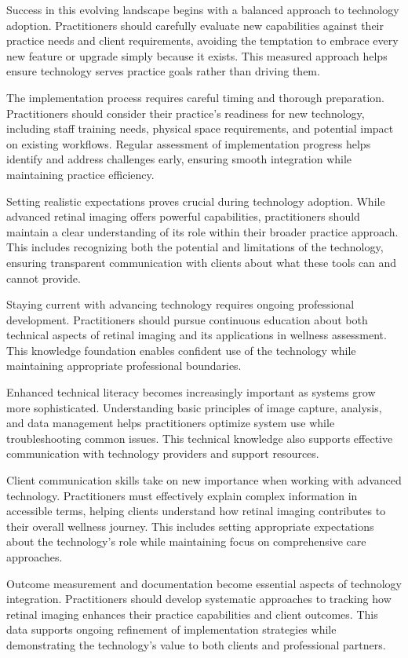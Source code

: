 \documentclass[
  Letterpaper,
]{scrbook}
\begin{document}
Success in this evolving landscape begins with a balanced approach to
technology adoption. Practitioners should carefully evaluate new
capabilities against their practice needs and client requirements,
avoiding the temptation to embrace every new feature or upgrade simply
because it exists. This measured approach helps ensure technology serves
practice goals rather than driving them.

The implementation process requires careful timing and thorough
preparation. Practitioners should consider their practice's readiness
for new technology, including staff training needs, physical space
requirements, and potential impact on existing workflows. Regular
assessment of implementation progress helps identify and address
challenges early, ensuring smooth integration while maintaining practice
efficiency.

Setting realistic expectations proves crucial during technology
adoption. While advanced retinal imaging offers powerful capabilities,
practitioners should maintain a clear understanding of its role within
their broader practice approach. This includes recognizing both the
potential and limitations of the technology, ensuring transparent
communication with clients about what these tools can and cannot
provide.

Staying current with advancing technology requires ongoing professional
development. Practitioners should pursue continuous education about both
technical aspects of retinal imaging and its applications in wellness
assessment. This knowledge foundation enables confident use of the
technology while maintaining appropriate professional boundaries.

Enhanced technical literacy becomes increasingly important as systems
grow more sophisticated. Understanding basic principles of image
capture, analysis, and data management helps practitioners optimize
system use while troubleshooting common issues. This technical knowledge
also supports effective communication with technology providers and
support resources.

Client communication skills take on new importance when working with
advanced technology. Practitioners must effectively explain complex
information in accessible terms, helping clients understand how retinal
imaging contributes to their overall wellness journey. This includes
setting appropriate expectations about the technology's role while
maintaining focus on comprehensive care approaches.

Outcome measurement and documentation become essential aspects of
technology integration. Practitioners should develop systematic
approaches to tracking how retinal imaging enhances their practice
capabilities and client outcomes. This data supports ongoing refinement
of implementation strategies while demonstrating the technology's value
to both clients and professional partners.
\end{document}
